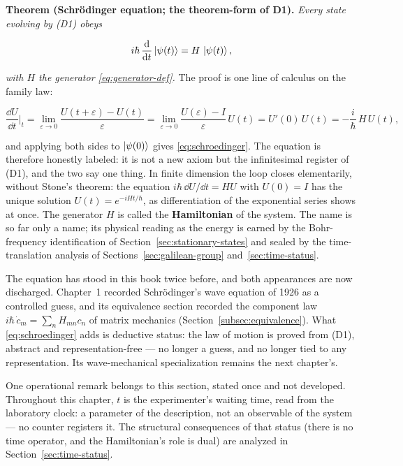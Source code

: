 \medskip\noindent\textbf{Theorem (Schr\"odinger equation; the theorem-form of D1).} \emph{Every state evolving by \textup{(D1)} obeys}
\begin{linenomath}
    \begin{equation}
        i\hbar\,\frac{\mathrm{d}}{\mathrm{d} t}\ket{\psi(t)} = H\,\ket{\psi(t)},
        \label{eq:schroedinger}
    \end{equation}
\end{linenomath}
\emph{with $H$ the generator \eqref{eq:generator-def}.} The proof is one line of calculus on the family law:
\begin{linenomath}
    \begin{equation*}
        \frac{\dd U}{\dd t}\bigg|_{t} = \lim_{\varepsilon\to 0}\frac{U(t+\varepsilon) - U(t)}{\varepsilon} = \lim_{\varepsilon\to 0}\frac{U(\varepsilon) - I}{\varepsilon}\,U(t) = U'(0)\,U(t) = -\frac{i}{\hbar}\,H\,U(t),
    \end{equation*}
\end{linenomath}
and applying both sides to $\ket{\psi(0)}$ gives \eqref{eq:schroedinger}. The equation is therefore honestly labeled: it is not a new axiom but the infinitesimal register of (D1), and the two say one thing. In finite dimension the loop closes elementarily, without Stone's theorem: the equation $i\hbar\,\dd U/\dd t = HU$ with $U(0) = I$ has the unique solution $U(t) = e^{-iHt/\hbar}$, as differentiation of the exponential series shows at once. The generator $H$ is called the \textbf{Hamiltonian} of the system. The name is so far only a name; its physical reading as the energy is earned by the Bohr-frequency identification of Section~\ref{sec:stationary-states} and sealed by the time-translation analysis of Sections~\ref{sec:galilean-group} and~\ref{sec:time-status}.

The equation has stood in this book twice before, and both appearances are now discharged. Chapter~1 recorded Schr\"odinger's wave equation of 1926 as a controlled guess, and its equivalence section recorded the component law $i\hbar\,\dot c_m = \sum_n H_{mn} c_n$ of matrix mechanics (Section~\ref{subsec:equivalence}). What \eqref{eq:schroedinger} adds is deductive status: the law of motion is proved from (D1), abstract and representation-free --- no longer a guess, and no longer tied to any representation. Its wave-mechanical specialization remains the next chapter's.

One operational remark belongs to this section, stated once and not developed. Throughout this chapter, $t$ is the experimenter's waiting time, read from the laboratory clock: a parameter of the description, not an observable of the system --- no counter registers it. The structural consequences of that status (there is no time operator, and the Hamiltonian's role is dual) are analyzed in Section~\ref{sec:time-status}.

